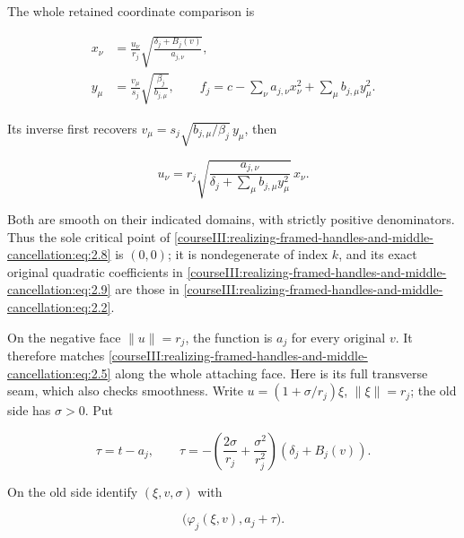 The whole retained coordinate comparison is

\begin{equation}
\begin{aligned}
 x_\nu&=\frac{u_\nu}{r_j}
       \sqrt{\frac{\delta_j+B_j(v)}{a_{j,\nu}}},\\
 y_\mu&=\frac{v_\mu}{s_j}\sqrt{\frac{\beta_j}{b_{j,\mu}}},
 \qquad
 f_j=c-\sum_\nu a_{j,\nu}x_\nu^2+
                   \sum_\mu b_{j,\mu}y_\mu^2 .
 \end{aligned}
 \label{courseIII:realizing-framed-handles-and-middle-cancellation:eq:2.9}
\end{equation}

Its inverse first recovers \(v_\mu=s_j\sqrt{b_{j,\mu}/\beta_j}\,y_\mu\), then

\begin{equation}
u_\nu=r_j\sqrt{\frac{a_{j,\nu}}{\delta_j+\sum_\mu b_{j,\mu}y_\mu^2}}\,
 x_\nu.
 \label{courseIII:realizing-framed-handles-and-middle-cancellation:eq:2.10}
\end{equation}

Both are smooth on their indicated domains, with strictly positive denominators. Thus the sole critical point of \eqref{courseIII:realizing-framed-handles-and-middle-cancellation:eq:2.8} is \((0,0)\); it is nondegenerate of index \(k\), and its exact original quadratic coefficients in \eqref{courseIII:realizing-framed-handles-and-middle-cancellation:eq:2.9} are those in \eqref{courseIII:realizing-framed-handles-and-middle-cancellation:eq:2.2}.

On the negative face \(\|u\|=r_j\), the function is \(a_j\) for every original \(v\). It therefore matches \eqref{courseIII:realizing-framed-handles-and-middle-cancellation:eq:2.5} along the whole attaching face. Here is its full transverse seam, which also checks smoothness. Write \(u=(1+\sigma/r_j)\xi\), \(\|\xi\|=r_j\); the old side has \(\sigma>0\). Put

\begin{equation}
\tau=t-a_j,\qquad
 \tau=-\left(\frac{2\sigma}{r_j}+
                    \frac{\sigma^2}{r_j^2}\right)(\delta_j+B_j(v)).
 \label{courseIII:realizing-framed-handles-and-middle-cancellation:eq:2.11}
\end{equation}

On the old side identify \((\xi,v,\sigma)\) with

\begin{equation}
\bigl(\varphi_j(\xi,v),a_j+\tau\bigr).
 \label{courseIII:realizing-framed-handles-and-middle-cancellation:eq:2.12}
\end{equation}

